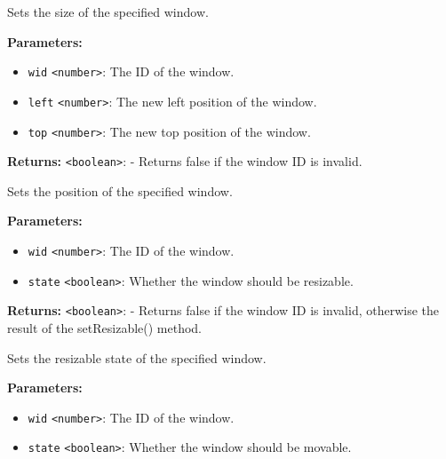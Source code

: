 \documentclass[12pt,a4paper]{article}
\begin{document}
\noindent Sets the size of the specified window.

\vspace{5mm}
\noindent {}


\noindent \textbf{Parameters:}
\begin{itemize}
  \item \texttt{wid} \texttt{<number>}: The ID of the window.
  \item \texttt{left} \texttt{<number>}: The new left position of the window.
  \item \texttt{top} \texttt{<number>}: The new top position of the window.
\end{itemize}

\noindent \textbf{Returns:} \texttt{<boolean>}: - Returns false if the window ID is invalid.

\noindent Sets the position of the specified window.

\vspace{5mm}
\noindent {}


\noindent \textbf{Parameters:}
\begin{itemize}
  \item \texttt{wid} \texttt{<number>}: The ID of the window.
  \item \texttt{state} \texttt{<boolean>}: Whether the window should be resizable.
\end{itemize}

\noindent \textbf{Returns:} \texttt{<boolean>}: - Returns false if the window ID is invalid, otherwise the result of the setResizable() method.

\noindent Sets the resizable state of the specified window.

\vspace{5mm}
\noindent {}


\noindent \textbf{Parameters:}
\begin{itemize}
  \item \texttt{wid} \texttt{<number>}: The ID of the window.
  \item \texttt{state} \texttt{<boolean>}: Whether the window should be movable.
\end{itemize}
\end{document}

